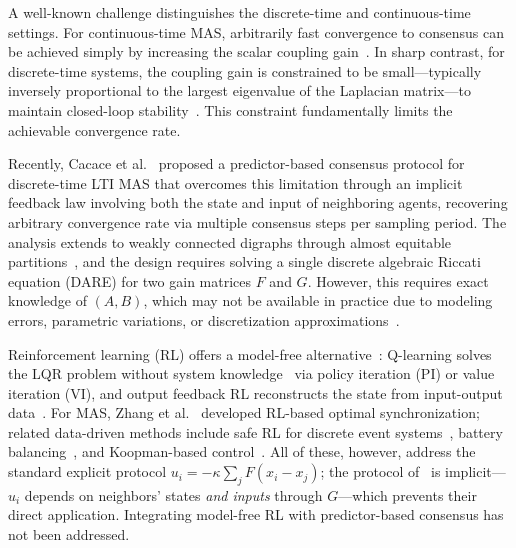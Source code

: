 \documentclass[final,5p,times]{elsarticle}
\theoremstyle{plain}
\theoremstyle{definition}
\theoremstyle{remark}
\begin{document}
A well-known challenge distinguishes the discrete-time and continuous-time settings. For continuous-time MAS, arbitrarily fast convergence to consensus can be achieved simply by increasing the scalar coupling gain~\cite{li2014,liu2021}. In sharp contrast, for discrete-time systems, the coupling gain is constrained to be small---typically inversely proportional to the largest eigenvalue of the Laplacian matrix---to maintain closed-loop stability~\cite{ma2015,ren2010,xiao2004}. This constraint fundamentally limits the achievable convergence rate.

Recently, Cacace et al.~\cite{cacace2024} proposed a predictor-based consensus protocol for discrete-time LTI MAS that overcomes this limitation through an implicit feedback law involving both the state and input of neighboring agents, recovering arbitrary convergence rate via multiple consensus steps per sampling period. The analysis extends to weakly connected digraphs through almost equitable partitions~\cite{monaco2019}, and the design requires solving a single discrete algebraic Riccati equation (DARE) for two gain matrices $F$ and $G$. However, this requires exact knowledge of $(A,B)$, which may not be available in practice due to modeling errors, parametric variations, or discretization approximations~\cite{dony2020tracking,dong2020tracking,dony2021robust}.

Reinforcement learning (RL) offers a model-free alternative~\cite{lewis2009}: Q-learning solves the LQR problem without system knowledge~\cite{bradtke1994} via policy iteration (PI) or value iteration (VI), and output feedback RL reconstructs the state from input-output data~\cite{rizvi2022}. For MAS, Zhang et al.~\cite{zhang2011} developed RL-based optimal synchronization; related data-driven methods include safe RL for discrete event systems~\cite{dony2025debf}, battery balancing~\cite{dony2026battery}, and Koopman-based control~\cite{dony2024koopman}. All of these, however, address the standard explicit protocol $u_i = -\kappa \sum_j F(x_i - x_j)$; the protocol of~\cite{cacace2024} is implicit---$u_i$ depends on neighbors' states \emph{and inputs} through $G$---which prevents their direct application. Integrating model-free RL with predictor-based consensus has not been addressed.
\end{document}
